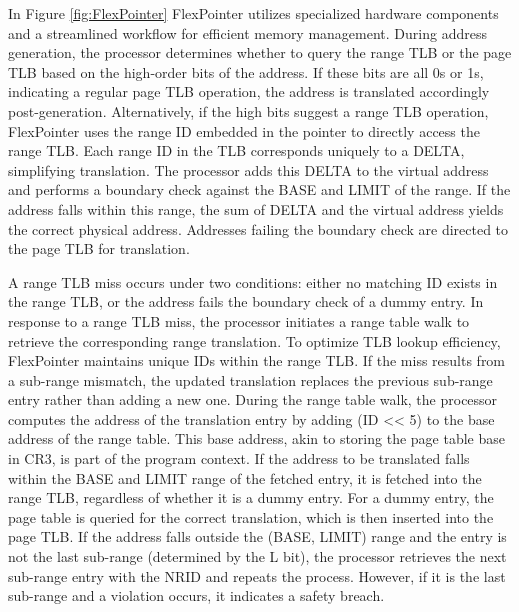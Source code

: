 In Figure \ref{fig:FlexPointer} FlexPointer utilizes specialized hardware components and a streamlined workflow for efficient memory management. During address generation, 
the processor determines whether to query the range TLB or the page TLB based on the high-order bits of the address. 
If these bits are all 0s or 1s, indicating a regular page TLB operation, the address is translated accordingly 
post-generation. Alternatively, if the high bits suggest a range TLB operation, FlexPointer uses the range ID 
embedded in the pointer to directly access the range TLB. Each range ID in the TLB corresponds uniquely to a 
DELTA, simplifying translation. The processor adds this DELTA to the virtual address and performs a boundary check 
against the BASE and LIMIT of the range. If the address falls within this range, the sum of DELTA and the 
virtual address yields the correct physical address. Addresses failing the boundary check are directed to the 
page TLB for translation.
\newline

A range TLB miss occurs under two conditions: either no matching ID exists in the range TLB, or the 
address fails the boundary check of a dummy entry. In response to a range TLB miss, the processor 
initiates a range table walk to retrieve the corresponding range translation. To optimize TLB lookup 
efficiency, FlexPointer maintains unique IDs within the range TLB. If the miss results from a sub-range mismatch, 
the updated translation replaces the previous sub-range entry rather than adding a new one. During the 
range table walk, the processor computes the address of the translation entry by adding (ID << 5) to the base address of the 
range table. This base address, akin to storing the page table base in CR3, is part of the program context. If the address to be 
translated falls within the BASE and LIMIT range of the fetched entry, it is fetched into the range TLB, regardless of whether 
it is a dummy entry. For a dummy entry, the page table is queried for the correct translation, which is then inserted 
into the page TLB. If the address falls outside the (BASE, LIMIT) range and the entry is not the last sub-range (determined by the L bit), the processor 
retrieves the next sub-range entry with the NRID and repeats the process. However, if it is the last sub-range and a violation occurs, it 
indicates a safety breach.

